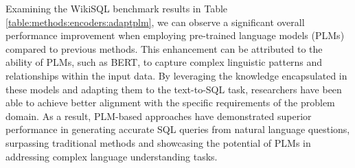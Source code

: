 Examining the WikiSQL benchmark results in Table \ref{table:methods:encoders:adaptplm}, we can observe a significant overall performance improvement when employing pre-trained language models (PLMs) compared to previous methods. This enhancement can be attributed to the ability of PLMs, such as BERT, to capture complex linguistic patterns and relationships within the input data. By leveraging the knowledge encapsulated in these models and adapting them to the text-to-SQL task, researchers have been able to achieve better alignment with the specific requirements of the problem domain. As a result, PLM-based approaches have demonstrated superior performance in generating accurate SQL queries from natural language questions, surpassing traditional methods and showcasing the potential of PLMs in addressing complex language understanding tasks.
